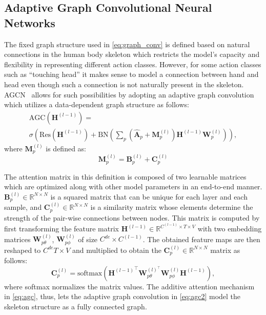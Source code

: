 \documentclass[journal]{IEEEtran}
\theoremstyle{definition}
\begin{document}
\subsection{Adaptive Graph Convolutional Neural Networks}
The fixed graph structure used in \cref{eq:graph_conv} is defined based on natural connections in the human body skeleton which restricts the model's capacity and flexibility in representing different action classes. However, for  some action classes such as ``touching head'' it makes sense to model a connection between hand and head even though such a connection is not naturally present in the skeleton. AGCN~\cite{shi2019two} allows for such possibilities by adopting an adaptive graph convolution which utilizes a data-dependent graph structure as follows:
\begin{multline}
    \text{AGC}\left(\mathbf{H}^{(l-1)}\right) = \\ \sigma\left(\text{Res}(\mathbf{H}^{(l-1)}) + \text{BN}\left(\sum_{p} (\mathbf{\hat{A}}_p + \mathbf{M}_p^{(l)})\mathbf{H}^{(l-1)}\mathbf{W}_p^{(l)} \right)\right), 
    \label{eq:agc}
\end{multline}
where $\mathbf{M}_p^{(l)}$ is defined as:
\begin{equation}
    \mathbf{M}_p^{(l)} = \mathbf{B}_p^{(l)} + \mathbf{C}_p^{(l)}
    \label{eq:agc-m}
\end{equation}

The attention matrix in this definition is composed of two learnable matrices which are optimized along with other model parameters in an end-to-end manner. $\mathbf{B}_p^{(l)} \in \mathbb{R}^{N \times N}$ is a squared matrix that can be unique for each layer and each sample, and $\mathbf{C}_p^{(l)} \in \mathbb{R}^{N \times N}$ is a similarity matrix whose elements determine the strength of the pair-wise connections between nodes. 
This matrix is computed by first transforming the feature matrix $\mathbf{H}^{(l-1)} \in \mathbb{R}^{C^{(l-1)} \times T \times V}$ with two embedding matrices $\mathbf{W}^{(l)}_{p\theta}$, $\mathbf{W}^{(l)}_{p\phi}$ of size $C^{de} \times C^{(l-1)}$. The obtained feature maps are then reshaped to $C^{de}T \times V$ and multiplied to obtain the $\mathbf{C}_p^{(l)} \in \mathbb{R}^{N \times N}$ matrix as follows:
\begin{equation}
    \mathbf{C}_p^{(l)} = \text{softmax}({\mathbf{H}^{(l-1)}}^{\top} \mathbf{W}_{p\theta}^{(l)^{\top}} \mathbf{W}_{p\phi}^{(l)} \mathbf{H}^{(l-1)}),
    \label{eq:agc2}
\end{equation}
where softmax normalizes the matrix values. 
The additive attention mechanism in \cref{eq:agc}, thus, lets the adaptive graph convolution in \cref{eq:agc2} model the skeleton structure as a fully connected graph.
\end{document}
